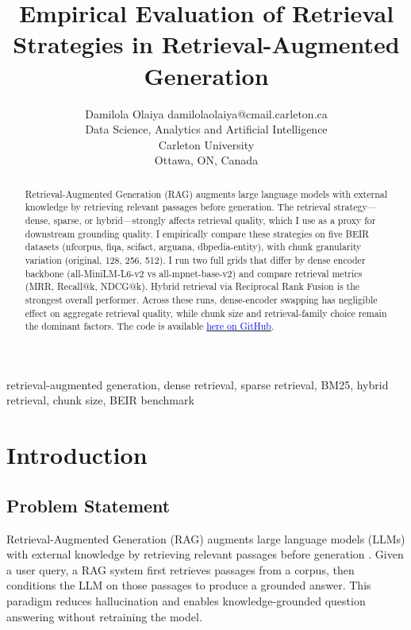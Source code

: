 \documentclass[twoside, 11pt]{article}
\begin{document}
\title{Empirical Evaluation of Retrieval Strategies in Retrieval-Augmented Generation}

\author{\name Damilola Olaiya \email damilolaolaiya@cmail.carleton.ca \\
\addr Data Science, Analytics and Artificial Intelligence\\
Carleton University\\
Ottawa, ON, Canada}

\maketitle

\begin{abstract}
Retrieval-Augmented Generation (RAG) augments large language models with external knowledge by retrieving relevant passages before generation. The retrieval strategy---dense, sparse, or hybrid---strongly affects retrieval quality, which I use as a proxy for downstream grounding quality. I empirically compare these strategies on five BEIR datasets (nfcorpus, fiqa, scifact, arguana, dbpedia-entity), with chunk granularity variation (original, 128, 256, 512). I run two full grids that differ by dense encoder backbone (all-MiniLM-L6-v2 vs all-mpnet-base-v2) and compare retrieval metrics (MRR, Recall@k, NDCG@k). Hybrid retrieval via Reciprocal Rank Fusion is the strongest overall performer. Across these runs, dense-encoder swapping has negligible effect on aggregate retrieval quality, while chunk size and retrieval-family choice remain the dominant factors. The code is available \href{https://github.com/Daolaiya/rag-retrieval}{\textcolor{blue}{here on GitHub}}.
\end{abstract}

\begin{keywords}
retrieval-augmented generation, dense retrieval, sparse retrieval, BM25, hybrid retrieval, chunk size, BEIR benchmark
\end{keywords}

\section{Introduction}
\subsection{Problem Statement}
Retrieval-Augmented Generation (RAG) augments large language models (LLMs) with external knowledge by retrieving relevant passages before generation \citep{lewis2020rag}. Given a user query, a RAG system first retrieves passages from a corpus, then conditions the LLM on those passages to produce a grounded answer. This paradigm reduces hallucination and enables knowledge-grounded question answering without retraining the model.
\end{document}
